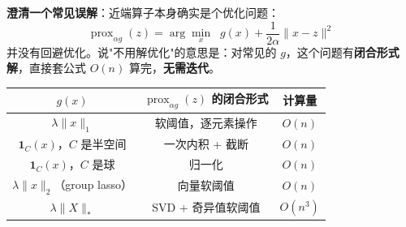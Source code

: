 \documentclass[12pt, a4paper]{ctexart}
\begin{document}
\begin{blackboard}

\textbf{澄清一个常见误解}：近端算子本身确实是个优化问题：
\[
\operatorname{prox}_{\alpha g}(z) = \arg\min_x \;\; g(x) + \frac{1}{2\alpha}\|x - z\|^2
\]
并没有回避优化。说"不用解优化"的意思是：对常见的 $g$，这个问题有\textbf{闭合形式解}，直接套公式 $O(n)$ 算完，\textbf{无需迭代}。

\begin{center}
\begin{tabular}{c|c|c}
$g(x)$ & $\operatorname{prox}_{\alpha g}(z)$ 的闭合形式 & 计算量 \\
\hline
$\lambda\|x\|_1$ & 软阈值，逐元素操作 & $O(n)$ \\
$\mathbf{1}_C(x)$，$C$ 是半空间 & 一次内积 + 截断 & $O(n)$ \\
$\mathbf{1}_C(x)$，$C$ 是球 & 归一化 & $O(n)$ \\
$\lambda\|x\|_2$（group lasso） & 向量软阈值 & $O(n)$ \\
$\lambda\|X\|_*$ & SVD + 奇异值软阈值 & $O(n^3)$ \\
\end{tabular}
\end{center}

\end{blackboard}
\end{document}
